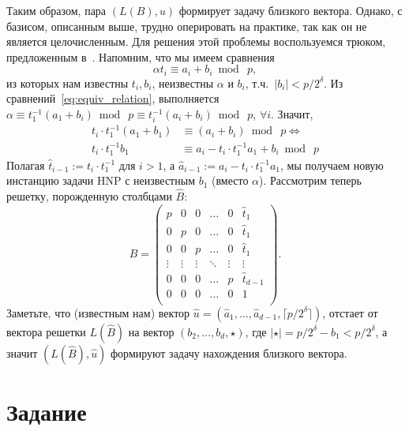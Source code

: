 \documentclass[11pt]{exam}
\theoremstyle{definition}
\begin{document}
{	Таким образом, пара $(L(B),u)$ формирует задачу близкого вектора. Однако, с базисом, описанным выше, трудно оперировать на практике, так как он не является целочисленным. Для решения этой проблемы воспользуемся трюком, предложенным в~\cite{AH}. Напомним, что мы имеем сравнения
	\begin{equation} \label{eq:equiv_relation}
		\alpha t_i \equiv a_i + b_i \bmod~p,
	\end{equation}
	из которых нам известны $t_i, b_i$, неизвестны $\alpha$ и $b_i$, т.ч.\ $|b_i|< p/2^\delta$. Из сравнений~\eqref{eq:equiv_relation}, выполняется $\alpha \equiv t_1^{-1}(a_1 +b_i)\bmod~p \equiv t_i^{-1}(a_i +b_i)\bmod~p$, $\forall i$. Значит,
	\begin{align*}
		t_i \cdot t_1^{-1}(a_1 +b_1) &\equiv (a_i +b_i) \bmod~p \iff  \\
		t_i \cdot t_1^{-1} b_1 & \equiv a_i -  t_i \cdot t_1^{-1}a_1 + b_i \bmod~p 
	\end{align*}
	Полагая $\hat{t}_{i-1}:= t_i\cdot t_1^{-1}$ для $i>1$, а $\hat{a}_{i-1}:= a_i -  t_i \cdot t_1^{-1}a_1$, мы получаем новую инстанцию задачи HNP с неизвестным $b_1$ (вместо $\alpha$). Рассмотрим теперь решетку, порожденную столбцами $\hat{B}$:
	\[
	\hat{B} = \begin{pmatrix}
	p & 0 & 0 & \ldots & 0 & \hat{t}_1 \\
	0 & p & 0 & \ldots & 0 & \hat{t}_1 \\
	0 & 0 & p & \ldots & 0 & \hat{t}_1 \\
	\vdots & \vdots & \vdots & \ddots & \vdots & \vdots \\
	0 & 0 & 0 & \ldots & p & \hat{t}_{d-1} \\
	0 & 0 & 0 & \ldots & 0 & 1 \\
	\end{pmatrix}.
	\]
	Заметьте, что (известным нам) вектор $\hat{u} = (\hat{a}_1, \ldots, \hat{a}_{d-1},  \lceil p/2^\delta \rceil)$, отстает от вектора решетки $L(\hat{B})$ на вектор $(b_2, \ldots, b_d, \star)$, где $|\star| = p/2^\delta - b_1 <p/2^\delta$, а значит $(L(\hat{B}), \hat{u})$ формируют задачу нахождения близкого вектора.
	
		
	
	\section{Задание}
	
}
\end{document}
